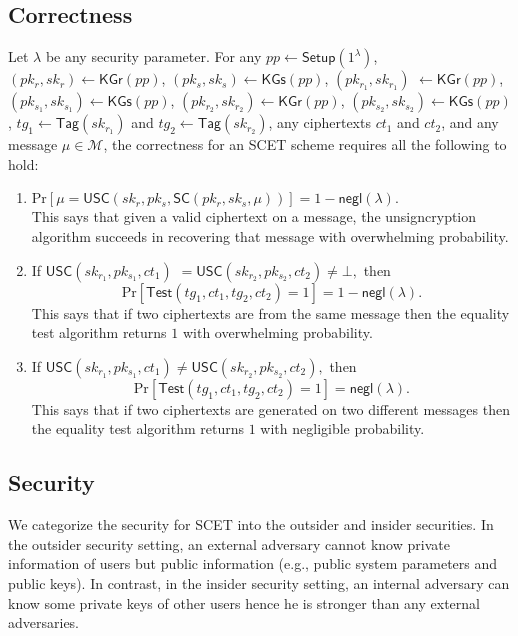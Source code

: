 \documentclass[a4paper,11pt,onecolumn]{elsarticle}
\def\Pr{\mathrm{Pr}}
\begin{document}
	\subsection{Correctness} \label{cor}
	Let $\lambda$ be any security parameter. For any $pp \leftarrow \textsf{Setup}(1^{\lambda})$, $(pk_r, sk_r) \leftarrow \textsf{KGr} (pp)$, $(pk_s, sk_s) \leftarrow \textsf{KGs} (pp)$,  $(pk_{r_1}, sk_{r_1}) $ $ \leftarrow \textsf{KGr} (pp)$, $(pk_{s_1}, sk_{s_1}) \leftarrow \textsf{KGs} (pp)$, $(pk_{r_2}, sk_{r_2}) \leftarrow \textsf{KGr} (pp)$, $(pk_{s_2}, sk_{s_2}) \leftarrow \textsf{KGs} (pp)$, $tg_1 \leftarrow \textsf{Tag}(sk_{r_1})$ and $tg_2 \leftarrow \textsf{Tag}(sk_{r_2})$, any ciphertexts $ct_1$ and $ct_2$, and any message $\mu \in \mathcal{M}$, the correctness for an SCET scheme requires all the following to hold:
	\begin{enumerate}
		\item $\Pr[\mu=\textsf{USC}(sk_r, pk_s,\textsf{SC}( pk_r, sk_s,\mu))]=1-\textsf{negl}(\lambda).$ \\This says that given a valid ciphertext on a message, the unsigncryption algorithm succeeds in recovering that message with overwhelming probability.
		\item If
		 $\textsf{USC}(sk_{r_1}, pk_{s_1},ct_1)$ $=\textsf{USC}(sk_{r_2}, pk_{s_2},ct_2) \neq \bot,$
		then $$\Pr[\textsf{Test}(tg_1,ct_1,tg_2,ct_2) =1]=1-\textsf{negl}(\lambda).$$ This says that if two ciphertexts are from the same message then the equality test algorithm returns $1$ with overwhelming probability.
		\item If
		$\textsf{USC}(sk_{r_1}, pk_{s_1},ct_1) \neq \textsf{USC}(sk_{r_2}, pk_{s_2},ct_2),$
		then $$\Pr[\textsf{Test}(tg_1,ct_1,tg_2,ct_2)=1]=\textsf{negl}(\lambda).$$ This says that if two ciphertexts are generated on two different messages  then the equality test algorithm returns $1$ with negligible probability.
	\end{enumerate}

	
	
	
	
	\subsection{Security} \label{sec}
		We categorize the security for SCET into the outsider and  insider securities. In the outsider security setting, an external adversary cannot know private information of users but  public information (e.g., public system parameters and public keys).
	In contrast,  in the insider security setting, an internal adversary can know some
	private keys of other users hence he is stronger than any external adversaries.  
	
\end{document}
